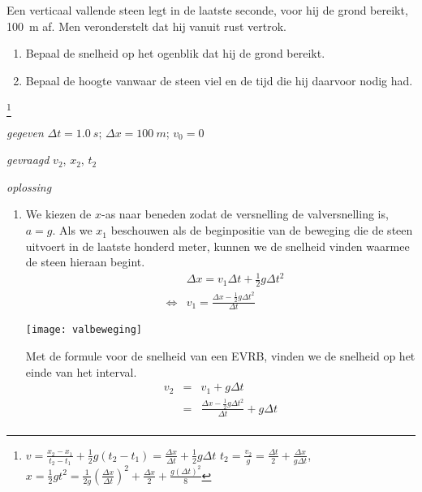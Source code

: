 \documentclass{ximera}
\begin{document}
\begin{exercise} Een verticaal vallende steen legt in de laatste seconde, voor hij de grond bereikt, \SI{100}{m} af. Men veronderstelt dat hij vanuit rust vertrok.
\begin{enumerate}
\item Bepaal de snelheid op het ogenblik dat hij de grond bereikt.
\item Bepaal de hoogte vanwaar de steen viel en de tijd die hij daarvoor nodig had.
\end{enumerate}
\begin{oplossing}
\footnote{$v=\frac{x_2-x_1}{t_2-t_1}+\frac{1}{2}g(t_2-t_1)=\frac{\Delta x}{\Delta t}+\frac{1}{2}g\Delta t$
\newline
$t_2=\frac{v_2}{g}=\frac{\Delta t}{2}+\frac{\Delta x}{g\Delta t}$, $x=\frac{1}{2}gt^2=\frac{1}{2g}\left(\frac{\Delta x}{\Delta t}\right)^2+\frac{\Delta x}{2}+\frac{g(\Delta t)^2}{8}$}
\item[\textit{gegeven}]$\Delta t=\SI{1,0}{s}$; $\Delta x=\SI{100}{m}$; $v_0=0$
\item[\textit{gevraagd}]$v_2$, $x_2$, $t_2$
\item[\textit{oplossing}]
\begin{enumerate}
\item 
\begin{minipage}[t]{.7\textwidth}
We kiezen de $x$-as naar beneden zodat de versnelling de valversnelling is, $a=g$. Als we $x_1$ beschouwen als de beginpositie van de beweging die de steen uitvoert in de laatste honderd meter, kunnen we de snelheid vinden waarmee de steen hieraan begint.
\begin{eqnarray*}
&&\Delta x=v_1\Delta t+\frac{1}{2}g\Delta t^2\\
&\Leftrightarrow&v_1=\frac{\Delta x-\frac{1}{2}g\Delta t^2}{\Delta t}
\end{eqnarray*}
\end{minipage}
\begin{minipage}[t][4.5cm][b]{.3\textwidth}
\texttt{[image: valbeweging]}
\end{minipage}
\newline
\newline
\newline
Met de formule voor de snelheid van een EVRB, vinden we de snelheid op het einde van het interval.
\begin{eqnarray*}
v_2&=&v_1+g\Delta t\\
&=&\frac{\Delta x-\frac{1}{2}g\Delta t^2}{\Delta t}+g\Delta t\\

\end{eqnarray*}
\end{enumerate}
\end{oplossing}
\end{exercise}
\end{document}
